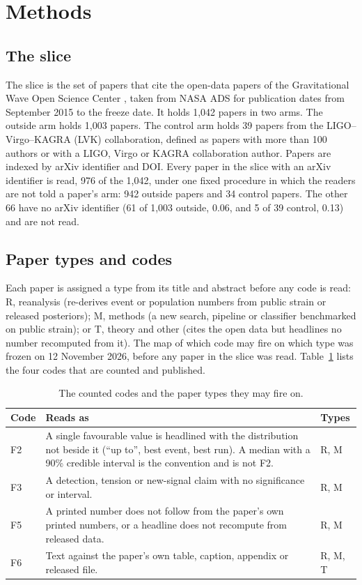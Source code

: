 \documentclass[reprint,amsmath,amssymb,aps,superscriptaddress,nofootinbib]{revtex4-2}
\begin{document}
\section{Methods}

\subsection{The slice}

The slice is the set of papers that cite the open-data papers of the Gravitational Wave Open Science Center \cite{GWOSC2021,GWOSC2023,Vallisneri2015}, taken from NASA ADS for publication dates from September 2015 to the freeze date. It holds 1,042 papers in two arms. The outside arm holds 1,003 papers. The control arm holds 39 papers from the LIGO--Virgo--KAGRA (LVK) collaboration, defined as papers with more than 100 authors or with a LIGO, Virgo or KAGRA collaboration author. Papers are indexed by arXiv identifier and DOI. Every paper in the slice with an arXiv identifier is read, 976 of the 1,042, under one fixed procedure in which the readers are not told a paper's arm: 942 outside papers and 34 control papers. The other 66 have no arXiv identifier (61 of 1,003 outside, 0.06, and 5 of 39 control, 0.13) and are not read.

\subsection{Paper types and codes}

Each paper is assigned a type from its title and abstract before any code is read: R, reanalysis (re-derives event or population numbers from public strain or released posteriors); M, methods (a new search, pipeline or classifier benchmarked on public strain); or T, theory and other (cites the open data but headlines no number recomputed from it). The map of which code may fire on which type was frozen on 12 November 2026, before any paper in the slice was read. Table~\ref{tab:codes} lists the four codes that are counted and published.

\begin{table}[t]
\caption{The counted codes and the paper types they may fire on.}
\label{tab:codes}
\centering\small
\begin{tabularx}{\linewidth}{l>{\raggedright\arraybackslash}X l}
\hline\hline
Code & Reads as & Types \\ \hline
F2 & A single favourable value is headlined with the distribution not beside it (``up to'', best event, best run). A median with a 90\% credible interval is the convention and is not F2. & R, M \\
F3 & A detection, tension or new-signal claim with no significance or interval. & R, M \\
F5 & A printed number does not follow from the paper's own printed numbers, or a headline does not recompute from released data. & R, M \\
F6 & Text against the paper's own table, caption, appendix or released file. & R, M, T \\
\hline\hline
\end{tabularx}
\end{table}
\end{document}
